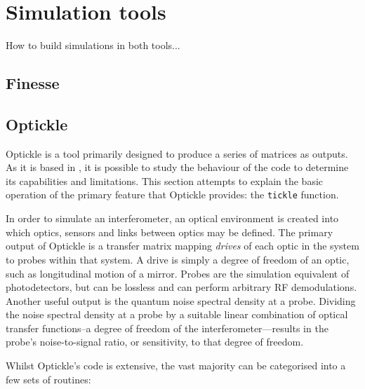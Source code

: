 \chapter{\label{a:simulation-tools}Simulation tools}
How to build simulations in both tools...




\section{\label{sec:finesse-sim}Finesse}

\section{\label{sec:optickle-sim}Optickle}
Optickle is a tool primarily designed to produce a series of matrices as outputs. As it is based in \MATLAB{}, it is possible to study the behaviour of the code to determine its capabilities and limitations. This section attempts to explain the basic operation of the primary feature that Optickle provides: the \lstinline!tickle! function.

In order to simulate an interferometer, an optical environment is created into which optics, sensors and links between optics may be defined. The primary output of Optickle is a transfer matrix mapping \emph{drives} of each optic in the system to probes within that system. A drive is simply a degree of freedom of an optic, such as longitudinal motion of a mirror. Probes are the simulation equivalent of photodetectors, but can be lossless and can perform arbitrary RF demodulations. Another useful output is the quantum noise spectral density at a probe. Dividing the noise spectral density at a probe by a suitable linear combination of optical transfer functions--a degree of freedom of the interferometer---results in the probe's noise-to-signal ratio, or sensitivity, to that degree of freedom.

Whilst Optickle's code is extensive, the vast majority can be categorised into a few sets of routines:

